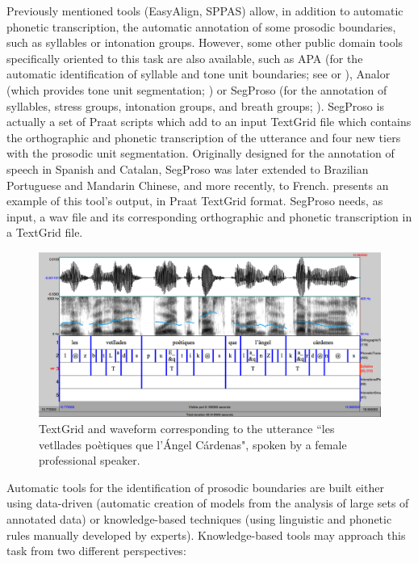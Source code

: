 \documentclass[output=paper]{langsci/langscibook}
\begin{document}
Previously mentioned tools (EasyAlign, SPPAS) allow, in addition to automatic phonetic transcription, the automatic annotation of some prosodic boundaries, such as syllables or intonation groups. However, some other public domain tools specifically oriented to this task are also available, such as APA (for the automatic identification of syllable and tone unit boundaries; see \citealt{Cutugno2002} or \citealt{Petrillo2004}), Analor (which provides tone unit segmentation; \citealt{Avanzi2008}) or SegProso (for the annotation of syllables, stress groups, intonation groups, and breath groups; \citealt{Garrido2013SegProso}). SegProso is actually a set of Praat scripts which add to an input TextGrid file which contains the orthographic and phonetic transcription of the utterance and four new tiers with the prosodic unit segmentation. Originally designed for the annotation of speech in Spanish and Catalan, SegProso was later extended to Brazilian Portuguese and Mandarin Chinese, and more recently, to French.  presents an example of this tool’s output, in Praat TextGrid format. SegProso needs, as input, a wav file and its corresponding orthographic and phonetic transcription in a TextGrid file.

\begin{figure}
\includegraphics[width=\textwidth]{figures/GAR-img002.png}
\caption{TextGrid and waveform corresponding to the utterance ``les vetllades poètiques que l’Ángel Cárdenas", spoken by a female professional speaker.}
\label{fig:gar:2}
\end{figure}

Automatic tools for the identification of prosodic boundaries are built either using data-driven (automatic creation of models from the analysis of large sets of annotated data) or knowledge-based techniques (using linguistic and phonetic rules manually developed by experts). Knowledge-based tools may approach this task from two different perspectives:
\end{document}
